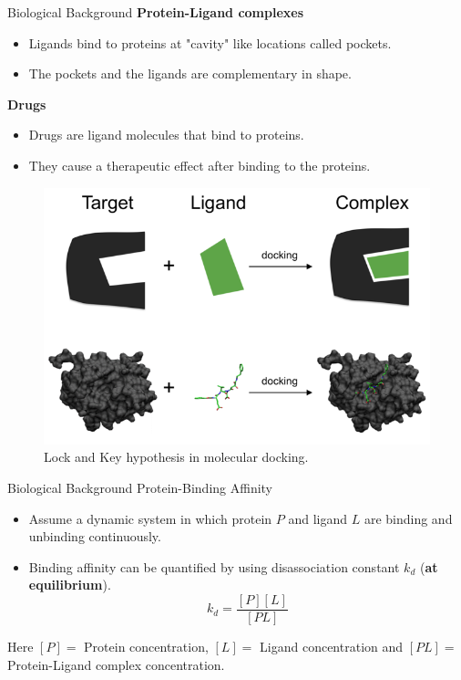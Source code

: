 \documentclass{beamer}
\begin{document}
\begin{frame}[t]{Biological Background}
\textbf{Protein-Ligand complexes}

\begin{itemize}
\item Ligands bind to proteins at "cavity" like locations called pockets.
\item The pockets and the ligands are complementary in shape.
\end{itemize}

\textbf{Drugs}
\begin{itemize}
\item Drugs are ligand molecules that bind to proteins.
\item They cause a therapeutic effect after binding to the proteins.
\end{itemize}

\begin{figure}[htb]
  \centering
    \includegraphics[scale=0.45]{images/lock_and_key}
    \caption{Lock and Key hypothesis in molecular docking.}
    \label{fig:lockandkey}
\end{figure}


\end{frame}

\begin{frame}[t]{Biological Background}
Protein-Binding Affinity

\begin{itemize}
\item Assume a dynamic system in which protein $P$ and ligand $L$ are binding and unbinding continuously.
\item Binding affinity can be quantified by using disassociation constant $k_d$ (\textbf{at equilibrium}).
$$ k_d = \frac{[P][L]}{[PL]}$$
\end{itemize}

Here $[P] = $ Protein concentration, $[L] = $ Ligand concentration and $[PL] = $ Protein-Ligand complex concentration.

\end{frame}
\end{document}
